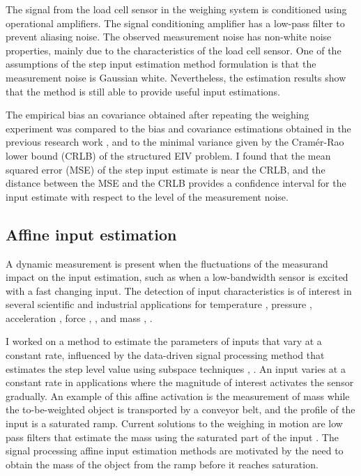The signal from the load cell sensor in the weighing system is conditioned using operational amplifiers.
The signal conditioning amplifier has a low-pass filter to prevent aliasing noise.
The observed measurement noise has non-white noise properties, mainly due to the characteristics of the load cell sensor.
One of the assumptions of the step input estimation method formulation is that the measurement noise is Gaussian white. 
Nevertheless, the estimation results show that the method is still able to provide useful input estimations.

The empirical bias an covariance obtained after repeating the weighing experiment was compared to the bias and covariance estimations obtained in the previous research work \citep{Quintana19}, and to the minimal variance given by the  Cram\'er-Rao lower bound (CRLB) of the structured EIV problem.
I found that the mean squared error (MSE) of the step input estimate is near the CRLB, and the distance between the MSE and the CRLB provides a confidence interval for the input estimate with respect to the level of the measurement noise. 

 
\subsection{Affine input estimation}

A dynamic measurement is present when the fluctuations of the measurand impact on the input estimation, such as when a low-bandwidth sensor is excited with a fast changing input.
The detection of input characteristics is of interest in several scientific and industrial applications for temperature \citep{Saggin01}, pressure \citep{Matthews14}, acceleration \citep{Link07}, force \citep{Vlajic16}, \citep{Hessling08a}, and mass \citep{Shu93}, \citep{Boschetti13}.

I worked on a method to estimate the parameters of inputs that vary at a constant rate, influenced by the data-driven signal processing method that estimates the step level value using subspace techniques \citep{Markovsky15cep}, \citep{Markovsky15ieee}.
An input varies at a constant rate in applications where the magnitude of interest activates the sensor gradually. 
An example of this affine activation is the measurement of mass while the to-be-weighted object is transported by a conveyor belt, and the profile of the input is a saturated ramp.
Current solutions to the weighing in motion are low pass filters that estimate the mass using the saturated part of the input \citep{Tasaki07, Pietrzak14}.
The signal processing affine input estimation methods are motivated by the need to obtain the mass of the object from the ramp before it reaches saturation.


